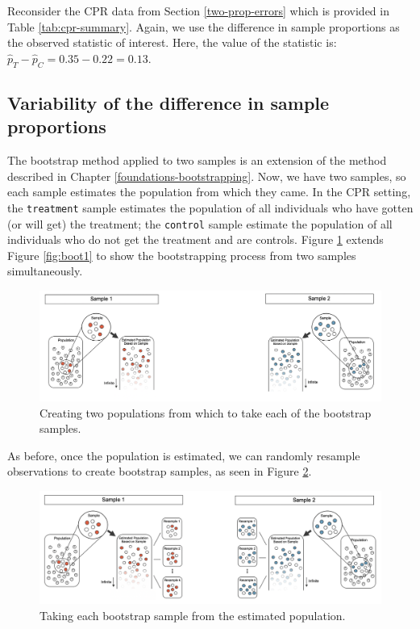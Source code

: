 \documentclass[
  10pt,
  openany]{book}
\begin{document}
Reconsider the CPR data from Section \ref{two-prop-errors} which is provided in Table \ref{tab:cpr-summary}.
Again, we use the difference in sample proportions as the observed statistic of interest.
Here, the value of the statistic is: \(\hat{p}_T - \hat{p}_C = 0.35 - 0.22 = 0.13.\)

\hypertarget{variability-of-the-difference-in-sample-proportions}{%
\subsection{Variability of the difference in sample proportions}\label{variability-of-the-difference-in-sample-proportions}}

The bootstrap method applied to two samples is an extension of the method described in Chapter \ref{foundations-bootstrapping}.
Now, we have two samples, so each sample estimates the population from which they came.
In the CPR setting, the \texttt{treatment} sample estimates the population of all individuals who have gotten (or will get) the treatment; the \texttt{control} sample estimate the population of all individuals who do not get the treatment and are controls.
Figure \ref{fig:boot2proppops} extends Figure \ref{fig:boot1} to show the bootstrapping process from two samples simultaneously.

\begin{figure}[h]

{\centering \includegraphics[width=1\linewidth]{images/boot2proppops} 

}

\caption{Creating two populations from which to take each of the bootstrap samples.}\label{fig:boot2proppops}
\end{figure}

As before, once the population is estimated, we can randomly resample observations to create bootstrap samples, as seen in Figure \ref{fig:boot2propresamps}.

\begin{figure}[h]

{\centering \includegraphics[width=1\linewidth]{images/boot2propresamps} 

}

\caption{Taking each bootstrap sample from the estimated population.}\label{fig:boot2propresamps}
\end{figure}
\end{document}
